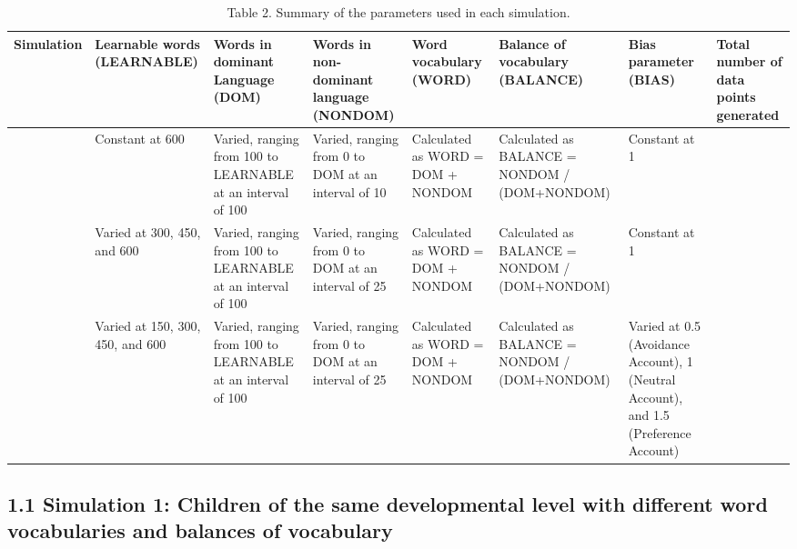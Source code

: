 \documentclass[
  english,
  ,man,floatsintext]{apa6}
\begin{document}
\begin{landscape}\begin{table}

\caption{\label{tab:table2}Table 2. Summary of the parameters used in each simulation.}
\centering
\fontsize{8}{10}\selectfont
\begin{tabular}[t]{>{\centering\arraybackslash}p{45px}>{\raggedright\arraybackslash}p{45px}>{\raggedright\arraybackslash}p{75px}>{\raggedright\arraybackslash}p{75px}>{\raggedright\arraybackslash}p{75px}>{\raggedright\arraybackslash}p{75px}>{\raggedright\arraybackslash}p{75px}>{\raggedright\arraybackslash}p{45px}}
\toprule
Simulation & Learnable words (LEARNABLE) & Words in dominant Language (DOM) & Words in non-dominant language (NONDOM) & Word vocabulary (WORD) & Balance of vocabulary (BALANCE) & Bias parameter (BIAS) & Total number of data points generated\\
\midrule
1 & Constant at 600 & Varied, ranging from 100 to LEARNABLE at an interval of 100 & Varied, ranging from 0 to DOM at an interval of 10 & Calculated as WORD = DOM + NONDOM & Calculated as BALANCE = NONDOM / (DOM+NONDOM) & Constant at 1 & 216\\
2 & Varied at 300, 450, and 600 & Varied, ranging from 100 to LEARNABLE at an interval of 100 & Varied, ranging from 0 to DOM at an interval of 25 & Calculated as WORD = DOM + NONDOM & Calculated as BALANCE = NONDOM / (DOM+NONDOM) & Constant at 1 & 161\\
3 & Varied at 150, 300, 450, and 600 & Varied, ranging from 100 to LEARNABLE at an interval of 100 & Varied, ranging from 0 to DOM at an interval of 25 & Calculated as WORD = DOM + NONDOM & Calculated as BALANCE = NONDOM / (DOM+NONDOM) & Varied at 0.5 (Avoidance Account), 1 (Neutral Account), and 1.5 (Preference Account) & 166\\
\bottomrule
\end{tabular}
\end{table}
\end{landscape}

\hypertarget{simulation-1-children-of-the-same-developmental-level-with-different-word-vocabularies-and-balances-of-vocabulary}{%
\subsection{1.1 Simulation 1: Children of the same developmental level with different word vocabularies and balances of vocabulary}\label{simulation-1-children-of-the-same-developmental-level-with-different-word-vocabularies-and-balances-of-vocabulary}}
\end{document}
